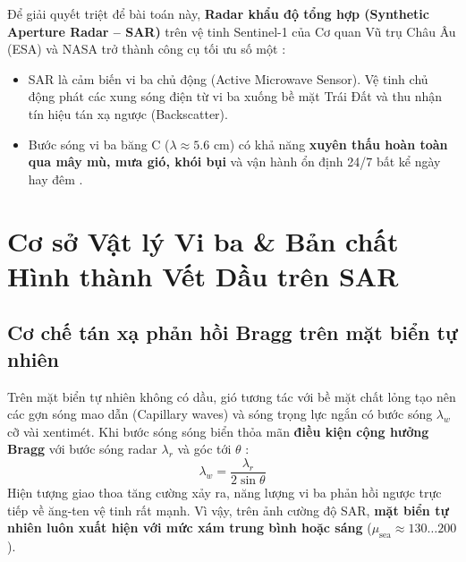 Để giải quyết triệt để bài toán này, \textbf{Radar khẩu độ tổng hợp (Synthetic Aperture Radar -- SAR)} trên vệ tinh Sentinel-1 của Cơ quan Vũ trụ Châu Âu (ESA) và NASA trở thành công cụ tối ưu số một \cite{esa2020sentinel1, nasa2024sar}:
\begin{itemize}
    \item SAR là cảm biến vi ba chủ động (Active Microwave Sensor). Vệ tinh chủ động phát các xung sóng điện từ vi ba xuống bề mặt Trái Đất và thu nhận tín hiệu tán xạ ngược (Backscatter).
    \item Bước sóng vi ba băng C ($\lambda \approx 5.6\text{ cm}$) có khả năng \textbf{xuyên thấu hoàn toàn qua mây mù, mưa gió, khói bụi} và vận hành ổn định 24/7 bất kể ngày hay đêm \cite{brekke2005oil}.
\end{itemize}



\section{Cơ sở Vật lý Vi ba \& Bản chất Hình thành Vết Dầu trên SAR}
\subsection{Cơ chế tán xạ phản hồi Bragg trên mặt biển tự nhiên}
Trên mặt biển tự nhiên không có dầu, gió tương tác với bề mặt chất lỏng tạo nên các gợn sóng mao dẫn (Capillary waves) và sóng trọng lực ngắn có bước sóng $\lambda_w$ cỡ vài xentimét. Khi bước sóng sóng biển thỏa mãn \textbf{điều kiện cộng hưởng Bragg} với bước sóng radar $\lambda_r$ và góc tới $\theta$ \cite{fingas2014review}:
\begin{equation}
\lambda_w = \frac{\lambda_r}{2 \sin \theta}
\label{eq:bragg}
\end{equation}
Hiện tượng giao thoa tăng cường xảy ra, năng lượng vi ba phản hồi ngược trực tiếp về ăng-ten vệ tinh rất mạnh. Vì vậy, trên ảnh cường độ SAR, \textbf{mặt biển tự nhiên luôn xuất hiện với mức xám trung bình hoặc sáng} ($\mu_{\text{sea}} \approx 130 \dots 200$).

